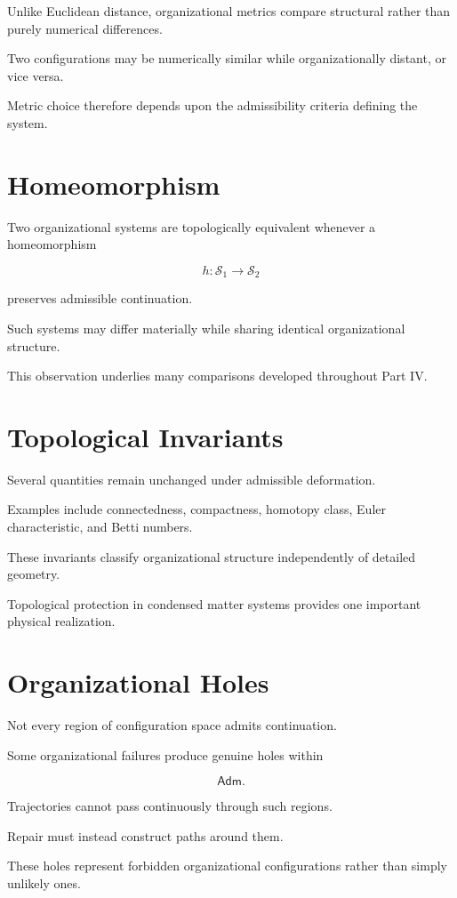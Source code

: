 \documentclass[11pt,oneside]{book}
\numberwithin{equation}{chapter}
\theoremstyle{definition}
\theoremstyle{plain}
\newcommand{\Adm}{\mathsf{Adm}}
\begin{document}
Unlike Euclidean distance, organizational metrics compare structural
rather than purely numerical differences.

Two configurations may be numerically similar while organizationally
distant, or vice versa.

Metric choice therefore depends upon the admissibility criteria defining
the system.

\section{Homeomorphism}

Two organizational systems are topologically equivalent whenever a
homeomorphism

\[
h
:
\mathcal S_1
\rightarrow
\mathcal S_2
\]

preserves admissible continuation.

Such systems may differ materially while sharing identical organizational
structure.

This observation underlies many comparisons developed throughout Part IV.

\section{Topological Invariants}

Several quantities remain unchanged under admissible deformation.

Examples include connectedness, compactness, homotopy class, Euler
characteristic, and Betti numbers.

These invariants classify organizational structure independently of
detailed geometry.

Topological protection in condensed matter systems provides one important
physical realization.

\section{Organizational Holes}

Not every region of configuration space admits continuation.

Some organizational failures produce genuine holes within

\[
\Adm.
\]

Trajectories cannot pass continuously through such regions.

Repair must instead construct paths around them.

These holes represent forbidden organizational configurations rather than
simply unlikely ones.
\end{document}

